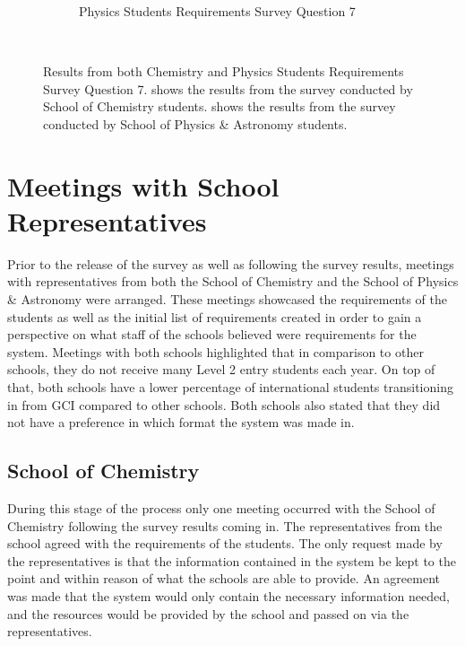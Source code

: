 \documentclass{l4proj}
\begin{document}
\begin{figure}[ht]
\begin{subfigure}[b]{0.7\textwidth}
        \caption{Physics Students Requirements Survey Question 7}
        \label{fig:req2}
    \end{subfigure}
    ~ %
    \caption{Results from both Chemistry and Physics Students Requirements Survey Question 7.  shows the results from the survey conducted by School of Chemistry students.  shows the results from the survey conducted by School of Physics \& Astronomy students.
    }\label{fig:requirements}
\end{figure}

\section{Meetings with School Representatives}
Prior to the release of the survey as well as following the survey results,  meetings with representatives from both the School of Chemistry and the School of Physics \& Astronomy were arranged. These meetings showcased the requirements of the students as well as the initial list of requirements created in order to gain a perspective on what staff of the schools believed were requirements for the system. Meetings with both schools highlighted that in comparison to other schools,  they do not receive many Level 2 entry students each year. On top of that,  both schools have a lower percentage of international students transitioning in from GCI compared to other schools. Both schools also stated that they did not have a preference in which format the system was made in.

\subsection{School of Chemistry}
During this stage of the process only one meeting occurred with the School of Chemistry following the survey results coming in. The representatives from the school agreed with the requirements of the students. The only request made by the representatives is that the information contained in the system be kept to the point and within reason of what the schools are able to provide. An agreement was made that the system would only contain the necessary information needed,  and the resources would be provided by the school and passed on via the representatives.
\end{document}
